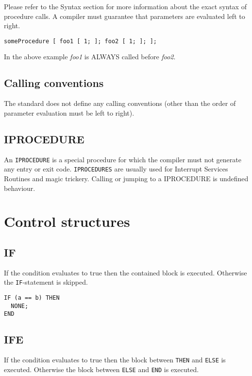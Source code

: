 Please refer to the Syntax section for more information about the exact syntax of procedure calls. A compiler must guarantee that parameters are evaluated left to right.

\begin{verbatim}
someProcedure [ foo1 [ 1; ]; foo2 [ 1; ]; ];
\end{verbatim}

In the above example \emph{foo1} is ALWAYS called before \emph{foo2}. 

\subsection{Calling conventions}

The standard does not define any calling conventions (other than the order of parameter evaluation must be left to right). 

\subsection{IPROCEDURE}

An \verb|IPROCEDURE| is a special procedure for which the compiler must not generate any entry or exit code. \verb|IPROCEDURES| are usually used
for Interrupt Services Routines and magic trickery. Calling or jumping to a IPROCEDURE is undefined behaviour. 

\section{Control structures}

\subsection{IF}

If the condition evaluates to true then the contained block is executed. Otherwise the \verb|IF|-statement is skipped.

\begin{verbatim}
IF (a == b) THEN
  NONE;
END
\end{verbatim} 

\subsection{IFE}

If the condition evaluates to true then the block between \verb|THEN| and \verb|ELSE| is executed. Otherwise the block between \verb|ELSE| and \verb|END|
is executed. 

